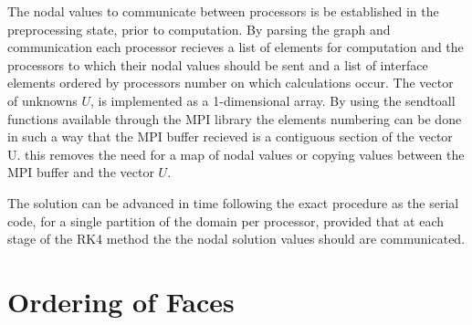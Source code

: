 The nodal values to communicate between processors is be established in the preprocessing state, prior to computation. By parsing the graph and communication each processor recieves a list of elements for computation and the processors to which their nodal values should be sent and a list of interface elements ordered by processors number on which calculations occur. The vector of unknowns $U$, is implemented as a 1-dimensional array. By using the sendtoall functions available through the MPI library the elements numbering can be done in such a way that the MPI buffer recieved is a contiguous section of the vector U. this removes the need for a map of nodal values or copying values between the MPI buffer and the vector $U$.

The solution can be advanced in time following the exact procedure as the serial code, for a single partition of the domain per processor, provided that at each stage of the RK4 method the the nodal solution values should are communicated.

\section{Ordering of Faces}
